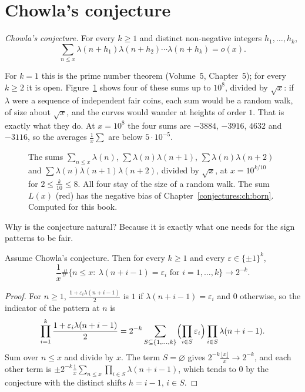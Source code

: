 \section{Chowla's conjecture}

\begin{center}
\emph{Chowla's conjecture.} For every $k\ge1$ and distinct non-negative integers $h_1,\dots,h_k$,
\[
\sum_{n\le x}\lambda(n+h_1)\lambda(n+h_2)\cdots\lambda(n+h_k)=o(x).
\]
\end{center}

For $k=1$ this is the prime number theorem (Volume~5, Chapter~5); for every $k\ge2$ it is open. Figure~\ref{conjectures:fig:chowla} shows four of these sums up to $10^8$,
divided by $\sqrt x$: if $\lambda$ were a sequence of independent fair coins, each sum would be a random walk, of size about $\sqrt x$, and the curves
would wander at heights of order $1$. That is exactly what they do. At $x=10^8$ the four sums are $-3884$, $-3916$, $4632$ and $-3116$, so the averages
$\frac1x\sum$ are below $5\cdot10^{-5}$.

\begin{figure}[ht]
\centering
{}
\caption{The sums $\sum_{n\le x}\lambda(n)$, $\sum\lambda(n)\lambda(n+1)$, $\sum\lambda(n)\lambda(n+2)$ and $\sum\lambda(n)\lambda(n+1)\lambda(n+2)$,
divided by $\sqrt x$, at $x=10^{k/10}$ for $2\le\frac k{10}\le8$. All four stay of the size of a random walk. The sum $L(x)$ (red) has the negative bias of
Chapter~\ref{conjectures:ch:born}. Computed for this book.}
\label{conjectures:fig:chowla}
\end{figure}

Why is the conjecture natural? Because it is exactly what one needs for the sign patterns to be fair.

\begin{proposition}\label{conjectures:prop:patterns}
Assume Chowla's conjecture. Then for every $k\ge1$ and every $\varepsilon\in\{\pm1\}^k$,
\[
\frac1x\#\bigl\{n\le x:\ \lambda(n+i-1)=\varepsilon_i\text{ for }i=1,\dots,k\bigr\}\longrightarrow2^{-k}.
\]
\end{proposition}
\begin{proof}
For $n\ge1$, $\frac{1+\varepsilon_i\lambda(n+i-1)}2$ is $1$ if $\lambda(n+i-1)=\varepsilon_i$ and $0$ otherwise, so the indicator of the pattern at $n$ is
\[
\prod_{i=1}^k\frac{1+\varepsilon_i\lambda(n+i-1)}2=2^{-k}\sum_{S\subseteq\{1,\dots,k\}}\Bigl(\prod_{i\in S}\varepsilon_i\Bigr)\prod_{i\in S}\lambda(n+i-1).
\]
Sum over $n\le x$ and divide by $x$. The term $S=\varnothing$ gives $2^{-k}\frac{\lfloor x\rfloor}x\to2^{-k}$, and each other term is $\pm2^{-k}\frac1x\sum_{n\le x}\prod_{i\in S}\lambda(n+i-1)$,
which tends to $0$ by the conjecture with the distinct shifts $h=i-1$, $i\in S$.
\end{proof}


